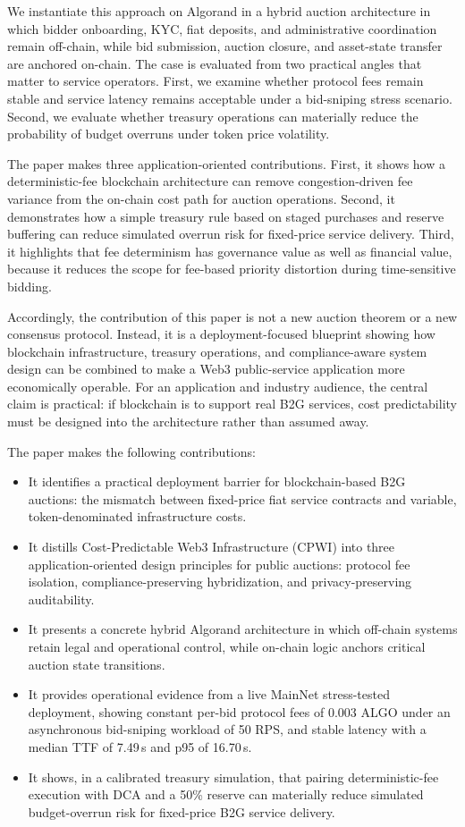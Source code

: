 \documentclass[runningheads]{llncs}
\begin{document}
We instantiate this approach on Algorand in a hybrid auction architecture in which bidder onboarding, KYC, fiat deposits, and administrative coordination remain off-chain, while bid submission, auction closure, and asset-state transfer are anchored on-chain. The case is evaluated from two practical angles that matter to service operators. First, we examine whether protocol fees remain stable and service latency remains acceptable under a bid-sniping stress scenario. Second, we evaluate whether treasury operations can materially reduce the probability of budget overruns under token price volatility.

The paper makes three application-oriented contributions. First, it shows how a deterministic-fee blockchain architecture can remove congestion-driven fee variance from the on-chain cost path for auction operations. Second, it demonstrates how a simple treasury rule based on staged purchases and reserve buffering can reduce simulated overrun risk for fixed-price service delivery. Third, it highlights that fee determinism has governance value as well as financial value, because it reduces the scope for fee-based priority distortion during time-sensitive bidding.

Accordingly, the contribution of this paper is not a new auction theorem or a new consensus protocol. Instead, it is a deployment-focused blueprint showing how blockchain infrastructure, treasury operations, and compliance-aware system design can be combined to make a Web3 public-service application more economically operable. For an application and industry audience, the central claim is practical: if blockchain is to support real B2G services, cost predictability must be designed into the architecture rather than assumed away.

The paper makes the following contributions:
\begin{itemize}
    \item It identifies a practical deployment barrier for blockchain-based B2G auctions: the mismatch between fixed-price fiat service contracts and variable, token-denominated infrastructure costs.
    \item It distills Cost-Predictable Web3 Infrastructure (CPWI) into three application-oriented design principles for public auctions: protocol fee isolation, compliance-preserving hybridization, and privacy-preserving auditability.
    \item It presents a concrete hybrid Algorand architecture in which off-chain systems retain legal and operational control, while on-chain logic anchors critical auction state transitions.
    \item It provides operational evidence from a live MainNet stress-tested deployment, showing constant per-bid protocol fees of 0.003 ALGO under an asynchronous bid-sniping workload of 50 RPS, and stable latency with a median TTF of 7.49\,s and p95 of 16.70\,s.
    \item It shows, in a calibrated treasury simulation, that pairing deterministic-fee execution with DCA and a 50\% reserve can materially reduce simulated budget-overrun risk for fixed-price B2G service delivery.
\end{itemize}
\end{document}
